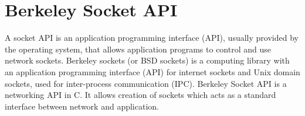 \section{Berkeley Socket API}
A socket API is an application programming interface (API), usually provided by the operating system, that allows application programs to control and use network sockets. Berkeley sockets (or BSD sockets) is a computing library with an application programming interface (API) for internet sockets and Unix domain sockets, used for inter-process communication (IPC).
Berkeley Socket API is a networking API in C.
It allows creation of sockets which acts as a   standard interface between network and application.